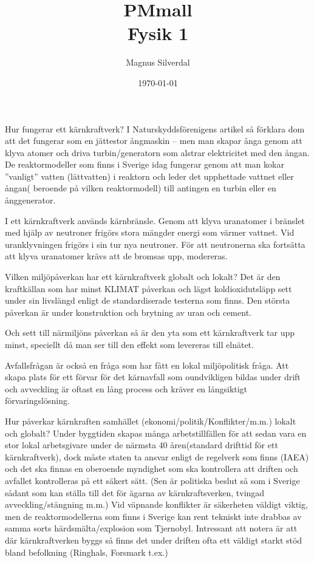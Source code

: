 \documentclass[11p]{article}
\title{PMmall \\ \small Fysik 1}
\author{Magnus Silverdal }
\date{\today}
\begin{document}
    Hur fungerar ett kärnkraftverk?
    I Naturskyddsförenigens artikel så förklara dom att det fungerar som en jättestor ångmaskin – men man skapar ånga genom att klyva atomer och driva turbin/generatorn som alstrar elektricitet med den ångan. De reaktormodeller som finns i Sverige idag fungerar genom att man kokar ”vanligt” vatten (lättvatten) i reaktorn och leder det upphettade vattnet eller ångan( beroende på vilken reaktormodell) till antingen en turbin eller en ånggenerator.

    I ett kärnkraftverk används kärnbränsle. Genom att klyva uranatomer i bränslet med hjälp av neutroner frigörs stora mängder energi som värmer vattnet. Vid uranklyvningen frigörs i sin tur nya neutroner. För att neutronerna ska fortsätta att klyva uranatomer krävs att de bromsas upp, modereras.

    Vilken miljöpåverkan har ett kärnkraftverk globalt och lokalt?
    Det är den kraftkällan som har minst KLIMAT påverkan och lägst koldioxidutsläpp sett under sin livslängd enligt de standardiserade testerna som finns. Den största påverkan är under konstruktion och brytning av uran  och cement.

    Och sett till närmiljöns påverkan så är den yta som ett kärnkraftverk tar upp minst, speciellt då man ser till den effekt som levereras till elnätet.

    Avfallsfrågan är också en fråga som har fått en lokal miljöpolitisk fråga. Att skapa plats för ett förvar för det kärnavfall som oundvikligen bildas under drift och avveckling är oftast en lång process och kräver en långsiktigt förvaringslösning.


    Hur påverkar kärnkraften samhället (ekonomi/politik/Konflikter/m.m.) lokalt och globalt?
    Under byggtiden skapas många arbetstillfällen för att sedan vara en stor lokal arbetsgivare under de närmsta 40 åren(standard drifttid för ett kärnkraftverk), dock måste staten ta ansvar enligt de regelverk som finns (IAEA) och det ska finnas en oberoende myndighet som ska kontrollera att driften och avfallet kontrolleras på ett säkert sätt. (Sen är politiska beslut så som i Sverige sådant som kan ställa till det för ägarna av kärnkraftsverken, tvingad avveckling/stängning m.m.) Vid väpnande konflikter är säkerheten väldigt viktig, men de reaktormodellerna som finns i Sverige kan rent tekniskt inte drabbas av samma sorts härdsmälta/explosion som Tjernobyl. Intressant att notera är att där kärnkraftverken byggs så finns det under driften ofta ett väldigt starkt stöd bland befolkning (Ringhals, Forsmark t.ex.)
\end{document}
